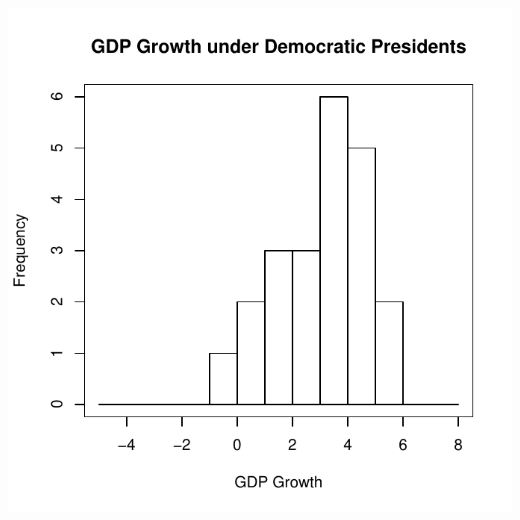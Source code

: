\documentclass[pdflatex,landscape,titlepage]{foils}
\begin{document}
\begin{center}
\color{black}
\includegraphics[width=7.5 in]{gdphist_dem}
\color{white}
\end{center}
\end{document}
